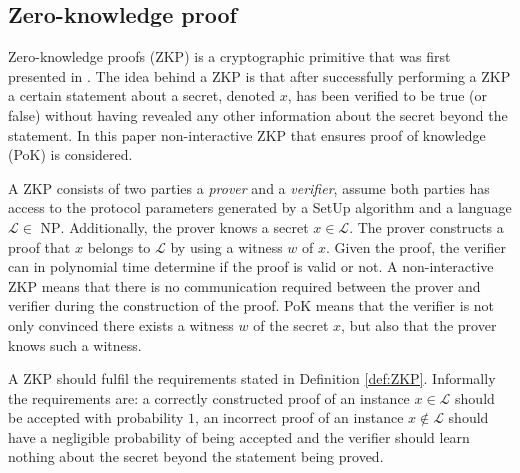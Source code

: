 \subsection*{Zero-knowledge proof}
Zero-knowledge proofs (ZKP) is a cryptographic primitive that was first presented in \cite{OG_ZKP}. The idea behind a ZKP is that after successfully performing a ZKP a certain statement about a secret, denoted $x$, has been verified to be true (or false) without having revealed any other information about the secret beyond the statement. In this paper non-interactive ZKP that ensures proof of knowledge (PoK) is considered.  %

A ZKP consists of two parties a \textit{prover} and a \textit{verifier},  assume both parties has access to the protocol parameters generated by a SetUp algorithm and a language $\mathcal{L}\in \text{ NP}$.  Additionally, the prover knows a secret $x\in \mathcal{L}$. The prover constructs a proof that $x$ belongs to $\mathcal{L}$ by using a witness $w$ of $x$. Given the proof, the verifier can in polynomial time determine if the proof is valid or not. 
A non-interactive ZKP means that there is no communication required between the prover and verifier during the construction of the proof. PoK means that the verifier is not only convinced there exists a witness $w$ of the secret $x$, but also that the prover knows such a witness.

A ZKP should fulfil the requirements stated in Definition \ref{def:ZKP}.  Informally the requirements are: a correctly constructed proof of an instance $x\in\mathcal{L}$ should be accepted with probability $1$, an incorrect proof of an instance $x\notin\mathcal{L}$ should have a negligible probability of being accepted and the verifier should learn nothing about the secret beyond the statement being proved.

